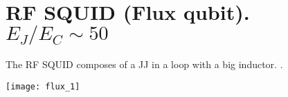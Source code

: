 

\section{RF    SQUID     (Flux    qubit).     $     E_J/E_C\sim    50
  $ \label{sec:rfSquid}}

\begin{framed}\noindent
  \noindent  The RF  SQUID composes  of a  JJ in  a loop  with a  big
  inductor.   .
  \begin{center}
    \texttt{[image: flux\_1]}
  \end{center}
\end{framed}



